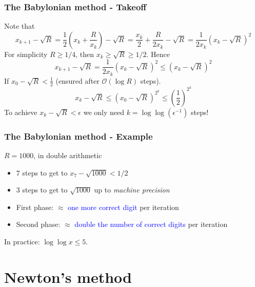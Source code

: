 \documentclass{beamer}
\begin{document}
\begin{frame}
  \frametitle{The Babylonian method - Takeoff}
  Note that
  \begin{equation}
    x_{k+1} - \sqrt{R} = \frac12 \left( x_k + \frac{R}{x_k} \right) - \sqrt{R} = \frac{x_k}{2} + \frac{R}{2 x_k} - \sqrt{R} = \frac{1}{2 x_k} {\left( x_k - \sqrt{R} \right)}^2
  \end{equation}
  For simplicity $R \ge 1/4$, then $x_k \ge \sqrt{R} \ge 1/2$. Hence
  \begin{equation}
    x_{k+1} - \sqrt{R} = \frac{1}{2 x_k} {\left( x_k - \sqrt{R} \right)}^2 \le {\left( x_k - \sqrt{R} \right)}^2
  \end{equation}
  If $x_0 - \sqrt{R} < \frac12$ (ensured after $\mathcal{O}(\log R)$ steps).
  \begin{equation}
    x_{k} - \sqrt{R} \le {\left( x_0 - \sqrt{R} \right)}^{2^k} \le {\left(\frac12\right)}^{2^k}
  \end{equation}
  To achieve $x_k - \sqrt{R} < \epsilon$ we only need $k = \log \log (\epsilon^{-1})$ steps!
\end{frame}

\begin{frame}
  \frametitle{The Babylonian method - Example}
  $R=1000$, in double arithmetic
  \begin{itemize}
    \item $7$ steps to get to $x_7 - \sqrt{1000} < 1/2$
          \item $3$ steps to get to $\sqrt{1000}$ up to \textit{machine precision}
          \item First phase: $\approx$ \textcolor{blue}{one more correct digit} per iteration
          \item Second phase: $\approx$ \textcolor{blue}{double the number of correct digits} per iteration
  \end{itemize}

  \begin{center}
    In practice: $\log \log x \le 5$.
  \end{center}

\end{frame}

\section{Newton's method}%
\label{sec:}
\end{document}
